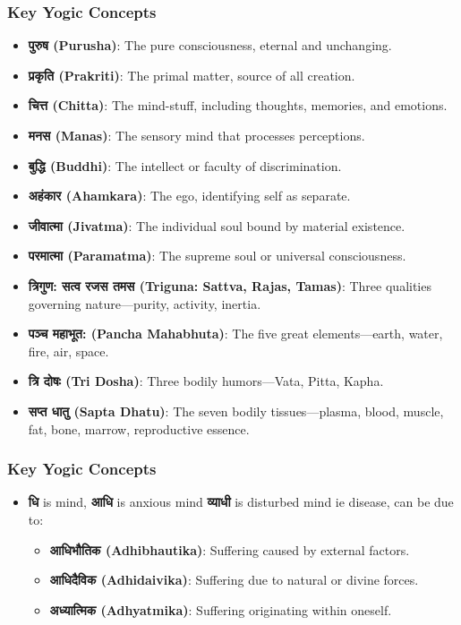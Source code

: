 \begin{frame}[fragile]\frametitle{Key Yogic Concepts}
      \begin{itemize}
        \item \textbf{पुरुष (Purusha)}: The pure consciousness, eternal and unchanging.
        \item \textbf{प्रकृति (Prakriti)}: The primal matter, source of all creation.
        \item \textbf{चित्त (Chitta)}: The mind-stuff, including thoughts, memories, and emotions.
        \item \textbf{मनस (Manas)}: The sensory mind that processes perceptions.
        \item \textbf{बुद्धि (Buddhi)}: The intellect or faculty of discrimination.
        \item \textbf{अहंकार (Ahamkara)}: The ego, identifying self as separate.
        \item \textbf{जीवात्मा (Jivatma)}: The individual soul bound by material existence.
        \item \textbf{परमात्मा (Paramatma)}: The supreme soul or universal consciousness.
        \item \textbf{त्रिगुण: सत्व रजस तमस (Triguna: Sattva, Rajas, Tamas)}: Three qualities governing nature—purity, activity, inertia.
        \item \textbf{पञ्च महाभूत: (Pancha Mahabhuta)}: The five great elements—earth, water, fire, air, space.
        \item \textbf{त्रि दोषः (Tri Dosha)}: Three bodily humors—Vata, Pitta, Kapha.
        \item \textbf{सप्त धातु (Sapta Dhatu)}: The seven bodily tissues—plasma, blood, muscle, fat, bone, marrow, reproductive essence.
      \end{itemize}
\end{frame}

\begin{frame}[fragile]\frametitle{Key Yogic Concepts}
      \begin{itemize}
		\item \textbf{धि} is mind, \textbf{आधि} is anxious mind \textbf{व्याधी } is disturbed mind ie disease, can be due to:
		\begin{itemize}
			\item \textbf{आधिभौतिक (Adhibhautika)}: Suffering caused by external factors.
			\item \textbf{आधिदैविक (Adhidaivika)}: Suffering due to natural or divine forces.
			\item \textbf{अध्यात्मिक (Adhyatmika)}: Suffering originating within oneself.
		\end{itemize}

      \end{itemize}
\end{frame}
